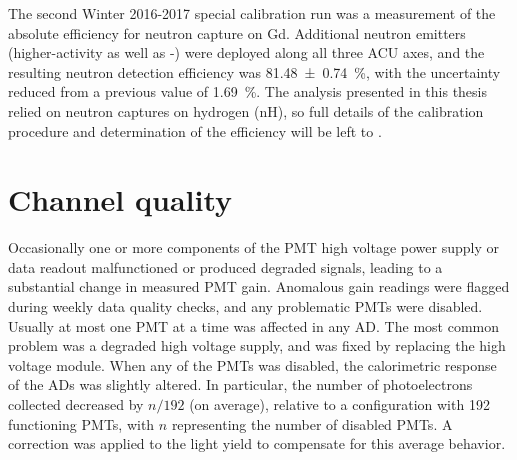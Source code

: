 The second Winter 2016-2017 special calibration run
was a measurement of the absolute efficiency for neutron capture on Gd.
Additional neutron emitters
(higher-activity \amc{} as well as -)
were deployed along all three ACU axes,
and the resulting neutron detection efficiency
was \SI{81.48\pm0.74}{\percent},
with the uncertainty reduced from a previous value of \SI{1.69}{\percent}.
The analysis presented in this thesis
relied on neutron captures on hydrogen (nH),
so full details of the calibration procedure and determination of the efficiency
will be left to \cite{reactor_flux2019}.

\section{Channel quality}
\label{sec:channel_quality}

Occasionally one or more components of the PMT high voltage power supply
or data readout malfunctioned or produced degraded signals,
leading to a substantial change in measured PMT gain.
Anomalous gain readings were flagged during weekly data quality checks,
and any problematic PMTs were disabled.
Usually at most one PMT at a time was affected in any AD.
The most common problem was a degraded high voltage supply,
and was fixed by replacing the high voltage module.
When any of the PMTs was disabled, the calorimetric response of the ADs
was slightly altered.
In particular, the number of photoelectrons collected
decreased by $n/192$ (on average),
relative to a configuration with \num{192} functioning PMTs,
with $n$ representing the number of disabled PMTs.
A correction was applied to the light yield to compensate for this average behavior.

